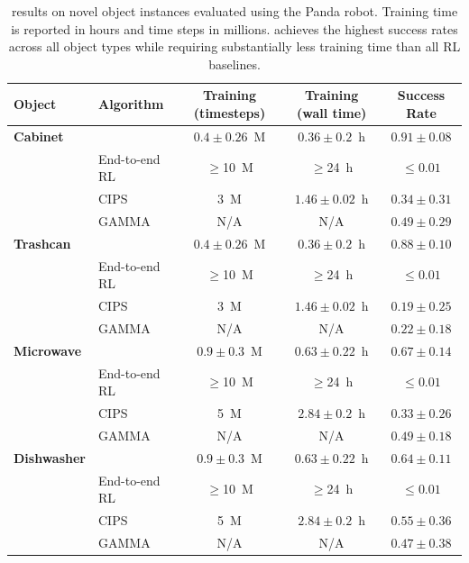 \begin{table}[htbp]
\small
\centering
\begin{tabular}{l l c c c}
\toprule
Object & Algorithm & Training (timesteps) & Training (wall time) & Success Rate \\
\midrule
\textbf{Cabinet} & \FLEX{} & $0.4 \pm 0.26$~M & $0.36 \pm 0.2$~h & $0.91 \pm 0.08$ \\
                  & End-to-end RL & $\geq$10~M & $\geq$24~h & $\leq 0.01$ \\
                  & CIPS & 3~M & $1.46 \pm 0.02$~h & $0.34 \pm 0.31$ \\
                  & GAMMA & N/A & N/A & $0.49 \pm 0.29$ \\
\midrule
\textbf{Trashcan} & \FLEX{} & $0.4 \pm 0.26$~M & $0.36 \pm 0.2$~h & $0.88 \pm 0.10$ \\
                   & End-to-end RL & $\geq$10~M & $\geq$24~h & $\leq 0.01$ \\
                   & CIPS & 3~M & $1.46 \pm 0.02$~h & $0.19 \pm 0.25$ \\
                   & GAMMA & N/A & N/A & $0.22 \pm 0.18$ \\
\midrule
\textbf{Microwave} & \FLEX{} & $0.9 \pm 0.3$~M & $0.63 \pm 0.22$~h & $0.67 \pm 0.14$ \\
                    & End-to-end RL & $\geq$10~M & $\geq$24~h & $\leq 0.01$ \\
                    & CIPS & 5~M & $2.84 \pm 0.2$~h & $0.33 \pm 0.26$ \\
                    & GAMMA & N/A & N/A & $0.49 \pm 0.18$ \\
\midrule
\textbf{Dishwasher} & \FLEX{} & $0.9 \pm 0.3$~M & $0.63 \pm 0.22$~h & $0.64 \pm 0.11$ \\
                     & End-to-end RL & $\geq$10~M & $\geq$24~h & $\leq 0.01$ \\
                     & CIPS & 5~M & $2.84 \pm 0.2$~h & $0.55 \pm 0.36$ \\
                     & GAMMA & N/A & N/A & $0.47 \pm 0.38$ \\
\bottomrule
\end{tabular}
\caption[\FLEX{} performance on novel objects]{\FLEX{} results on novel object instances evaluated using the Panda robot. Training time is reported in hours and time steps in millions. \FLEX{} achieves the highest success rates across all object types while requiring substantially less training time than all RL baselines.}
\label{tab:flex_results}
\end{table}
